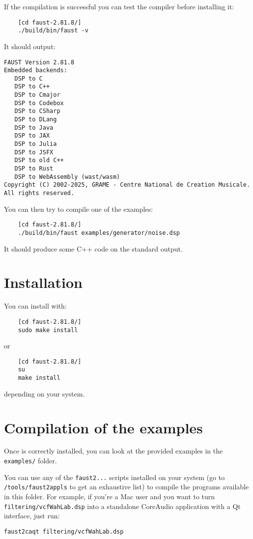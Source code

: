 If the compilation is successful you can test the compiler before installing it:
\begin{lstlisting}
	[cd faust-2.81.8/]
	./build/bin/faust -v
\end{lstlisting}
It should output:
\begin{lstlisting}
FAUST Version 2.81.8
Embedded backends: 
   DSP to C
   DSP to C++
   DSP to Cmajor
   DSP to Codebox
   DSP to CSharp
   DSP to DLang
   DSP to Java
   DSP to JAX
   DSP to Julia
   DSP to JSFX
   DSP to old C++
   DSP to Rust
   DSP to WebAssembly (wast/wasm)
Copyright (C) 2002-2025, GRAME - Centre National de Creation Musicale. All rights reserved. 
\end{lstlisting}

You can then try to compile one of the examples:
\begin{lstlisting}
	[cd faust-2.81.8/]
	./build/bin/faust examples/generator/noise.dsp
\end{lstlisting}
It should produce some C++ code on the standard output.

\section{Installation}
You can install \faust with:
\begin{lstlisting}
	[cd faust-2.81.8/]
	sudo make install
\end{lstlisting}
or
\begin{lstlisting}
	[cd faust-2.81.8/]
	su
	make install
\end{lstlisting}
depending on your system.

\section{Compilation of the examples}

Once \faust is correctly installed, you can look at the provided examples in the \lstinline'examples/' folder. 

You can use any of the \lstinline'faust2...' scripts installed on your system (go to \lstinline'/tools/faust2appls' to get an exhaustive list) to compile the \faust programs available in this folder. For example, if you're a Mac user and you want to turn \lstinline'filtering/vcfWahLab.dsp' into a standalone CoreAudio application with a Qt interface, just run:

\lstinline'faust2caqt filtering/vcfWahLab.dsp'
